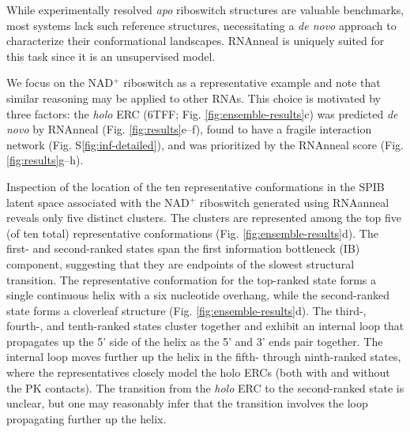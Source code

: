 \documentclass[%
aip,
 amsmath,amssymb,
reprint,%
twocolumn,
]{revtex4-1}
\newcommand{\lh}[1]{{\color{red}{#1}}}
\begin{document}
{While experimentally resolved {\it apo} riboswitch structures are valuable benchmarks, most systems lack such reference structures, necessitating a {\it de novo} approach to characterize their conformational landscapes. RNAnneal is uniquely suited for this task since it is an unsupervised model.

We focus on the NAD$^{+}$ riboswitch as a representative example and note that similar reasoning may be applied to other RNAs. This choice is motivated by three factors: the {\it holo} ERC (6TFF\cite{Huang2020}; Fig. \ref{fig:ensemble-results}c) was predicted {\it de novo} by RNAnneal (Fig. \ref{fig:results}e–f), found to have a fragile interaction network (Fig. S\ref{fig:inf-detailed}), and was prioritized by the RNAnneal score (Fig. \ref{fig:results}g–h).

Inspection of the location of the ten representative conformations in the SPIB latent space associated with the NAD$^{+}$ riboswitch generated using RNAanneal reveals only five distinct clusters. The clusters are represented among the top five (of ten total) representative conformations (Fig. \ref{fig:ensemble-results}d). The first- and second-ranked states span the first information bottleneck (IB) component, suggesting that they are endpoints of the slowest structural transition. The representative conformation for the top-ranked state forms a single continuous helix with a six nucleotide overhang, while the second-ranked state forms a cloverleaf structure (Fig. \ref{fig:ensemble-results}d). The third-, fourth-, and tenth-ranked states cluster together and exhibit an internal loop that propagates up the 5' side of the helix as the 5' and 3' ends pair together. The internal loop moves further up the helix in the fifth- through ninth-ranked states, where the representatives closely model the holo ERCs (both with and without the PK contacts). The transition from the {\it holo} ERC to the second-ranked state is unclear, but one may reasonably infer that the transition involves the loop propagating further up the helix. 




}
\end{document}
